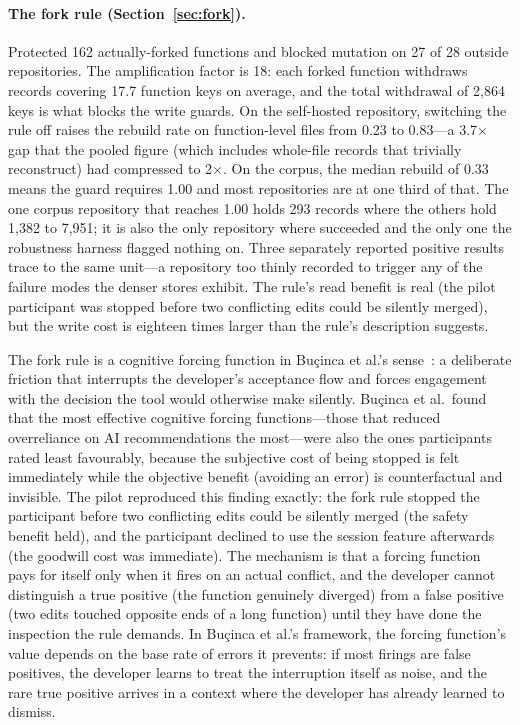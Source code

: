\paragraph{The fork rule (Section~\ref{sec:fork}).}
Protected 162 actually-forked functions and blocked mutation on 27 of 28
outside repositories. The amplification factor is 18: each forked function
withdraws records covering 17.7 function keys on average, and the total
withdrawal of 2{,}864 keys is what blocks the write guards. On the self-hosted
repository, switching the rule off raises the rebuild rate on function-level
files from 0.23 to 0.83---a 3.7$\times$ gap that the pooled figure (which
includes whole-file records that trivially reconstruct) had compressed to
2$\times$.
On the corpus, the median rebuild of 0.33 means the guard requires 1.00 and
most repositories are at one third of that. The one corpus repository that
reaches 1.00 holds 293 records where the others hold 1{,}382 to 7{,}951; it
is also the only repository where  succeeded and the only one
the robustness harness flagged nothing on. Three separately reported positive
results trace to the same unit---a repository too thinly recorded to trigger
any of the failure modes the denser stores exhibit. The rule's read benefit is
real (the pilot participant was stopped before two conflicting edits could be
silently merged), but the write cost is eighteen times larger than the rule's
description suggests.

The fork rule is a cognitive forcing function in
Bu\c{c}inca et al.'s sense~\cite{bucinca2021}: a deliberate friction that
interrupts the developer's acceptance flow and forces engagement with the
decision the tool would otherwise make silently. Bu\c{c}inca et al.\ found
that the most effective cognitive forcing functions---those that reduced
overreliance on AI recommendations the most---were also the ones participants
rated least favourably, because the subjective cost of being stopped is felt
immediately while the objective benefit (avoiding an error) is counterfactual
and invisible. The pilot reproduced this finding exactly: the fork rule
stopped the participant before two conflicting edits could be silently merged
(the safety benefit held), and the participant declined to use the session
feature afterwards (the goodwill cost was immediate). The mechanism is that a
forcing function pays for itself only when it fires on an actual conflict, and
the developer cannot distinguish a true positive (the function genuinely
diverged) from a false positive (two edits touched opposite ends of a long
function) until they have done the inspection the rule demands. In
Bu\c{c}inca et al.'s framework, the forcing function's value depends on the
base rate of errors it prevents: if most firings are false positives, the
developer learns to treat the interruption itself as noise, and the rare true
positive arrives in a context where the developer has already learned to
dismiss.

